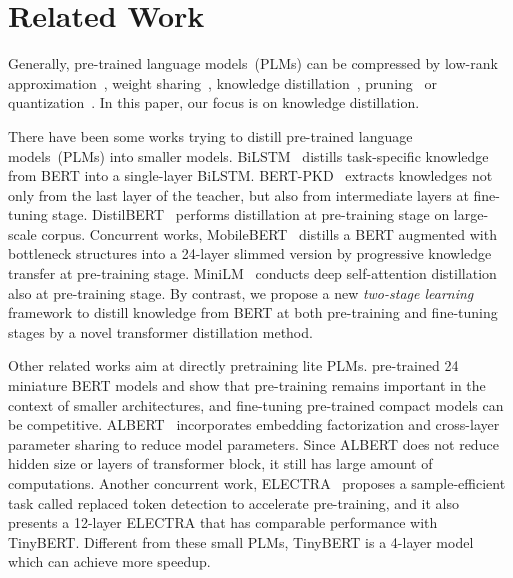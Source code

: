 \documentclass[11pt,a4paper]{article}
\begin{document}
 
\section{Related Work}\label{sec:related}


Generally, pre-trained language models~(PLMs) can be compressed by low-rank approximation~\cite{ma2019tensorized,Lan2020ALBERT}, weight sharing~\cite{dehghani2018universal,Lan2020ALBERT}, knowledge distillation~\cite{tang2019distilling,sanh2019distilbert,turc2019well,sun2020mobilebert,liu2020fastbert,wang2020minilm}, pruning~\cite{cui2019fine,mccarley2019pruning,Fan2020Reducing,Elbayad2020Depth-Adaptive,gordon2020compressing,hou2020dynabert} or quantization~\cite{shen2019q,zafrir2019q8bert}. In this paper, our focus is on knowledge distillation.

There have been some works trying to distill pre-trained language models~(PLMs) into smaller models. BiLSTM~\cite{tang2019distilling} distills task-specific knowledge from BERT into a single-layer BiLSTM. BERT-PKD~\cite{sun2019patient} extracts knowledges not only from the last layer of the teacher, but also from intermediate layers at fine-tuning stage. DistilBERT~\cite{sanh2019distilbert} performs distillation at pre-training stage on large-scale corpus. Concurrent works, MobileBERT~\cite{sun2020mobilebert} distills a BERT augmented with bottleneck structures into a 24-layer slimmed version by progressive knowledge transfer at pre-training stage. MiniLM~\cite{wang2020minilm} conducts deep self-attention distillation also at pre-training stage. By contrast, we propose a new {\it two-stage learning} framework to distill knowledge from BERT at both pre-training and fine-tuning stages by a novel transformer distillation method. 


Other related works aim at directly pretraining lite PLMs. \citet{turc2019well} pre-trained 24 miniature BERT models and show that pre-training remains important in the context of smaller architectures, and fine-tuning pre-trained compact models can be competitive. ALBERT~\cite{Lan2020ALBERT} incorporates embedding factorization and cross-layer parameter sharing to reduce model parameters. Since ALBERT does not reduce hidden size or layers of transformer block, it still has large amount of computations. Another concurrent work, ELECTRA~\cite{clark2020electra} proposes a sample-efficient task called replaced token detection to accelerate pre-training, and it also presents a 12-layer ELECTRA that has comparable performance with TinyBERT. Different from these small PLMs, TinyBERT is a 4-layer model which can achieve more speedup.
\end{document}
